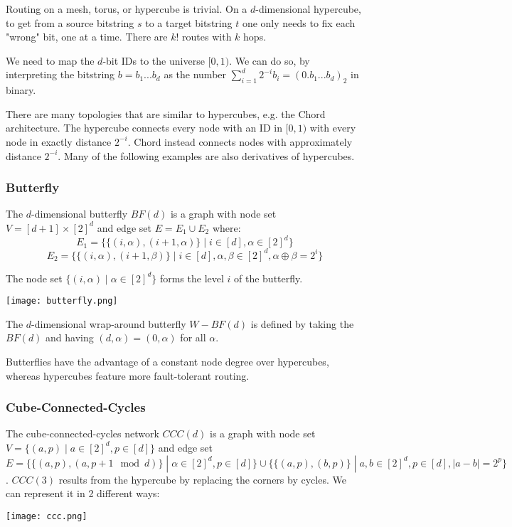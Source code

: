 Routing on a mesh, torus, or hypercube is trivial. On a $d$-dimensional hypercube, to get from a source bitstring $s$ to a target bitstring $t$ one only needs to fix each "wrong" bit, one at a time. There are $k!$ routes with $k$ hops. \medskip

We need to map the $d$-bit IDs to the universe $[0, 1)$. We can do so, by interpreting the bitstring $b = b_1 ... b_d$ as the number $\sum_{i=1}^d 2^{-i} b_i = (0.b_1 ... b_d)_2$ in binary. \medskip

There are many topologies that are similar to hypercubes, e.g. the Chord architecture. The hypercube connects every node with an ID in $[0,1)$ with every node in exactly distance $2^{-i}$. Chord instead connects nodes with approximately distance $2^{-i}$. Many of the following examples are also derivatives of hypercubes.

\subsubsection{Butterfly}

The $d$-dimensional butterfly $BF(d)$ is a graph with node set $V = [d+1] \times [2]^d$ and edge set $E = E_1 \cup E_2$ where:
$$E_1 = \{\{ (i, \alpha), (i+1, \alpha)\} \; | \; i \in [d], \alpha \in [2]^d\}$$
$$E_2 = \{\{ (i, \alpha), (i+1, \beta)\} \; | \; i \in [d], \alpha, \beta \in [2]^d, \alpha \oplus \beta = 2^i \}$$

The node set $\{(i, \alpha) \; | \; \alpha \in [2]^d\}$ forms the level $i$ of the butterfly. 
\begin{center}
	\texttt{[image: butterfly.png]}
\end{center}

The $d$-dimensional wrap-around butterfly $W - BF(d)$ is defined by taking the $BF(d)$ and having $(d, \alpha) = (0, \alpha)$ for all $\alpha$. \medskip

Butterflies have the advantage of a constant node degree over hypercubes, whereas hypercubes feature more fault-tolerant routing.

\subsubsection{Cube-Connected-Cycles}

The cube-connected-cycles network $CCC(d)$ is a graph with node set $V = \{ (a,p) \; | \; a \in [2]^d, p \in [d] \} $ and edge set $E = \{\{ (a,p), (a, p+1 \mod d) \} \; | \; \alpha \in [2]^d, p \in [d]\} \cup \{\{(a,p), (b,p)\} \; | \; a,b \in [2]^d, p \in [d], |a-b| = 2^p \}$. $CCC(3)$ results from the hypercube by replacing the corners by cycles. We can represent it in 2 different ways:
\begin{center}
	\texttt{[image: ccc.png]}
\end{center}


